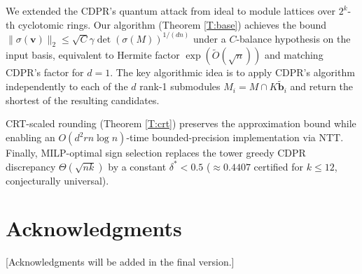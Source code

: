\documentclass[11pt,a4paper]{article}
\theoremstyle{plain}
\theoremstyle{definition}
\theoremstyle{remark}
\newcommand{\tO}{\tilde{O}}
\begin{document}
We extended the CDPR's quantum attack from ideal to module lattices over $2^k$-th cyclotomic rings. Our algorithm (Theorem \ref{T:base}) achieves the bound $\|\sigma(\mathbf{v})\|_2\le\sqrt{C} \gamma\det(\sigma(M))^{1/(dn)}$ under a $C$-balance hypothesis on the input basis, equivalent to Hermite factor $\exp(\tO(\sqrt n))$ and matching CDPR's factor for $d=1$. The key algorithmic idea is to apply CDPR's algorithm independently to each of the $d$ rank-1 submodules $M_i=M\cap K\tilde{\mathbf{b}}_i$ and return the shortest of the resulting candidates.

CRT-scaled rounding (Theorem \ref{T:crt}) preserves the approximation bound while enabling an $O(d^2 r n\log n)$-time bounded-precision implementation via NTT. Finally, MILP-optimal sign selection replaces the tower greedy CDPR discrepancy $\Theta(\sqrt{nk})$ by a constant $\delta^*<0.5$ ($\approx 0.4407$ certified for $k\leq 12$, conjecturally universal).

\section*{Acknowledgments}

[Acknowledgments will be added in the final version.]

%
%
\end{document}
